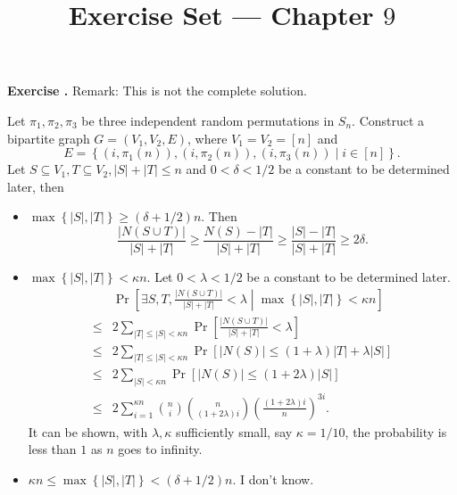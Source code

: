 \documentclass[a4paper]{article}
\title{Exercise Set --- Chapter $9$}
\date{}
\newenvironment{exercise}[1]{
	\par
	\noindent\textbf{Exercise #1.}\quad
}{
	\par
	\bigskip
}
\newcommand{\pbra}[1]{\left( #1 \right)}
\newcommand{\cbra}[1]{\left\{ #1 \right\}}
\newcommand{\sbra}[1]{\left[ #1 \right]}
\begin{document}
\maketitle

\begin{exercise}{1}
    \textbf{Remark: This is not the complete solution.}

    Let $\pi_1,\pi_2,\pi_3$ be three independent random permutations in $S_n$.
    Construct a bipartite graph $G=(V_1,V_2,E)$, where $V_1=V_2=[n]$ and 
    $$
    E=\cbra{(i,\pi_1(n)),(i,\pi_2(n)),(i,\pi_3(n))\middle|i\in[n]}.
    $$
    Let $S\subseteq V_1,T\subseteq V_2,|S|+|T|\leq n$ and $0<\delta<1/2$ be a constant to be determined later, then 
    \begin{itemize}
        \item $\max\cbra{|S|,|T|}\geq(\delta+1/2)n$. Then 
            $$
            \frac{|N(S\cup T)|}{|S|+|T|}\geq\frac{N(S)-|T|}{|S|+|T|}\geq\frac{|S|-|T|}{|S|+|T|}\geq2\delta.
            $$
        \item $\max\cbra{|S|,|T|}<\kappa n$. Let $0<\lambda<1/2$ be a constant to be determined later.
            \begin{align*}
                &\Pr\sbra{\exists S,T,\frac{|N(S\cup T)|}{|S|+|T|}<\lambda\middle|\max\cbra{|S|,|T|}<\kappa n}\\
                \leq&2\sum_{|T|\leq|S|<\kappa n}\Pr\sbra{\frac{|N(S\cup T)|}{|S|+|T|}<\lambda}\\
                \leq&2\sum_{|T|\leq|S|<\kappa n}\Pr\sbra{|N(S)|\leq(1+\lambda)|T|+\lambda|S|}\\
                \leq&2\sum_{|S|<\kappa n}\Pr\sbra{|N(S)|\leq(1+2\lambda)|S|}\\
                \leq&2\sum_{i=1}^{\kappa n}\binom ni\binom n{(1+2\lambda)i}\pbra{\frac{(1+2\lambda)i}n}^{3i}.
            \end{align*}
            It can be shown, with $\lambda,\kappa$ sufficiently small, say $\kappa=1/10$, the probability is less than $1$ as $n$ goes to infinity.
        \item $\kappa n\leq\max\cbra{|S|,|T|}<(\delta+1/2)n$. I don't know.
    \end{itemize}
\end{exercise}
\end{document}
